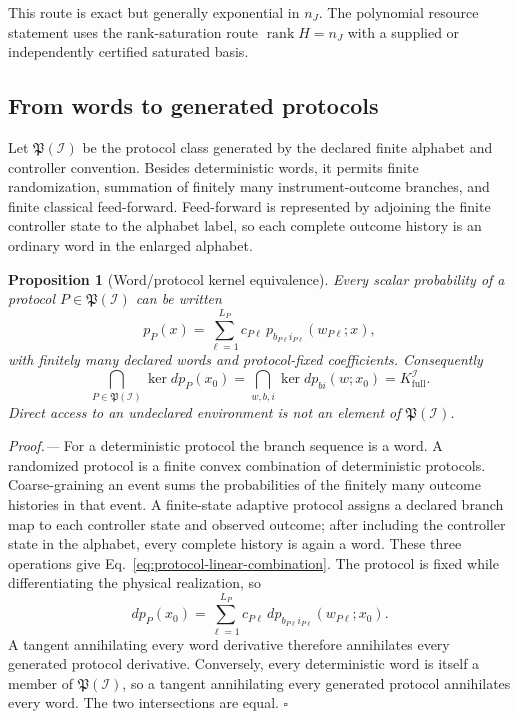 \documentclass[aps,prl,reprint,superscriptaddress,nofootinbib]{revtex4-2}
\newcommand{\rank}{\operatorname{rank}}
\newcommand{\full}{\mathrm{full}}
\newtheorem{proposition}{Proposition}
\begin{document}
This route is exact but generally exponential in $n_J$.  The polynomial resource statement uses the rank-saturation route $\rank H=n_J$ with a supplied or independently certified saturated basis.

\subsection{From words to generated protocols}
\label{sec:words-to-protocols}

Let $\mathfrak P(\mathcal I)$ be the protocol class generated by the declared finite alphabet and controller convention.  Besides deterministic words, it permits finite randomization, summation of finitely many instrument-outcome branches, and finite classical feed-forward.  Feed-forward is represented by adjoining the finite controller state to the alphabet label, so each complete outcome history is an ordinary word in the enlarged alphabet.

\begin{proposition}[Word/protocol kernel equivalence]
\label{prop:word-protocol-kernel}
Every scalar probability of a protocol $P\in\mathfrak P(\mathcal I)$ can be written
\begin{equation}
 p_P(x)=\sum_{\ell=1}^{L_P}c_{P\ell}\,
 p_{b_{P\ell}i_{P\ell}}(w_{P\ell};x),
 \label{eq:protocol-linear-combination}
\end{equation}
with finitely many declared words and protocol-fixed coefficients.  Consequently
\begin{equation}
 \bigcap_{P\in\mathfrak P(\mathcal I)}\ker dp_P(x_0)
 =
 \bigcap_{w,b,i}\ker dp_{bi}(w;x_0)
 =K_{\full}^{\mathcal I}.
 \label{eq:protocol-kernel-equivalence}
\end{equation}
Direct access to an undeclared environment is not an element of $\mathfrak P(\mathcal I)$.
\end{proposition}

\emph{Proof.---}
For a deterministic protocol the branch sequence is a word.  A randomized protocol is a finite convex combination of deterministic protocols.  Coarse-graining an event sums the probabilities of the finitely many outcome histories in that event.  A finite-state adaptive protocol assigns a declared branch map to each controller state and observed outcome; after including the controller state in the alphabet, every complete history is again a word.  These three operations give Eq.~\eqref{eq:protocol-linear-combination}.  The protocol is fixed while differentiating the physical realization, so
\begin{equation}
 dp_P(x_0)=\sum_{\ell=1}^{L_P}c_{P\ell}\,
 dp_{b_{P\ell}i_{P\ell}}(w_{P\ell};x_0).
\end{equation}
A tangent annihilating every word derivative therefore annihilates every generated protocol derivative.  Conversely, every deterministic word is itself a member of $\mathfrak P(\mathcal I)$, so a tangent annihilating every generated protocol annihilates every word.  The two intersections are equal. \hfill$\square$
\end{document}
